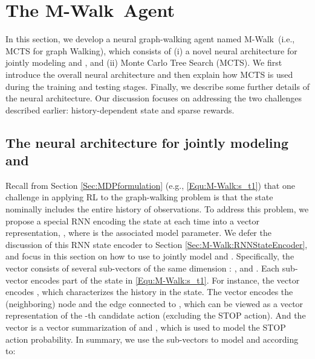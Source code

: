 \documentclass{article}
\newcommand{\modelname}{M-Walk}
\begin{document}
	
\section{The \modelname~Agent}
\label{Sec:\modelname}
	
	In this section, we develop a neural graph-walking agent named \modelname~(i.e., MCTS for graph Walking), which consists of (i) a novel neural architecture for jointly modeling  and , and (ii) Monte Carlo Tree Search (MCTS). We first introduce the overall neural architecture and then explain how MCTS is used during the training and testing stages. Finally, we describe some further details of the neural architecture. Our discussion focuses on addressing the two challenges described earlier: history-dependent state and sparse rewards.
	
\subsection{The neural architecture for jointly modeling  and }
\label{Sec:\modelname:Model}
	
	Recall from Section \ref{Sec:MDPformulation} (e.g., \eqref{Equ:\modelname:s_t1}) that one challenge in applying RL to the graph-walking problem is that the state  nominally includes the entire history of observations. To address this problem, we propose a special RNN encoding the state  at each time  into a vector representation, , where  is the associated model parameter. We defer the discussion of this RNN state encoder to Section \ref{Sec:\modelname:RNNStateEncoder}, and focus in this section on how to use  to jointly model  and . Specifically, the vector   consists of several sub-vectors of the same dimension : ,   and . Each sub-vector encodes part of the state  in \eqref{Equ:\modelname:s_t1}. For instance, the vector  encodes , which characterizes the history in the state. The vector  encodes the (neighboring) node  and the edge  connected to , which can be viewed as a vector representation of the -th candidate action (excluding the STOP action). And the vector  is a vector summarization of  and , which is used to model the STOP action probability. In summary, we use the sub-vectors to model  and  according to:
    	
\end{document}
